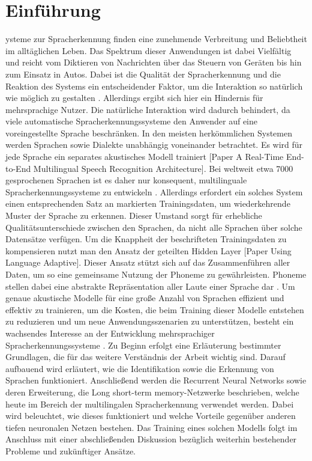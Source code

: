 \section{Einführung}\label{sec:introduction}
ysteme zur Spracherkennung finden eine zunehmende Verbreitung und Beliebtheit im alltäglichen Leben. Das Spektrum dieser Anwendungen ist dabei Vielfältig und reicht vom Diktieren von Nachrichten über das Steuern von Geräten bis hin zum Einsatz in Autos. Dabei ist die Qualität der Spracherkennung und die Reaktion des Systems ein entscheidender Faktor, um die Interaktion so natürlich wie möglich zu gestalten \cite{Yu.2014}. Allerdings ergibt sich hier ein Hindernis für mehrsprachige Nutzer. Die natürliche Interaktion wird dadurch behindert, da viele automatische Spracherkennungssysteme den Anwender auf eine voreingestellte Sprache beschränken. In den meisten herkömmlichen Systemen werden Sprachen sowie Dialekte unabhängig voneinander betrachtet. Es wird für jede Sprache ein separates akustisches Modell trainiert [Paper A Real-Time End-to-End Multilingual Speech Recognition Architecture]. Bei weltweit etwa 7000 gesprochenen Sprachen ist es daher nur konsequent, multilinguale Spracherkennungssysteme zu entwickeln \cite{Gary.2018}. Allerdings erfordert ein solches System einen entsprechenden Satz an markierten Trainingsdaten, um wiederkehrende Muster der Sprache zu erkennen. 
Dieser Umstand sorgt für erhebliche Qualitätsunterschiede zwischen den Sprachen, da nicht alle Sprachen über solche Datensätze verfügen. Um die Knappheit der beschrifteten Trainingsdaten zu kompensieren nutzt man den Ansatz der geteilten Hidden Layer [Paper Using Language Adaptive]. Dieser Ansatz stützt sich auf das Zusammenführen aller Daten, um so eine gemeinsame Nutzung der Phoneme zu gewährleisten.  Phoneme stellen dabei eine abstrakte Repräsentation aller Laute einer Sprache dar . Um genaue akustische Modelle für eine große Anzahl von Sprachen effizient und effektiv zu trainieren, um die Kosten, die beim Training dieser Modelle entstehen zu reduzieren und um neue Anwendungsszenarien zu unterstützen, besteht ein wachsendes Interesse an der Entwicklung mehrsprachiger Spracherkennungssysteme \cite{Yu.2014}. 
Zu Beginn erfolgt eine Erläuterung bestimmter Grundlagen, die für das weitere Verständnis der Arbeit wichtig sind. Darauf aufbauend wird erläutert, wie die Identifikation sowie die Erkennung von Sprachen funktioniert. Anschließend werden die Recurrent Neural Networks sowie deren Erweiterung, die Long short-term memory-Netzwerke beschrieben, welche heute im Bereich der multilingalen Spracherkennung verwendet werden. Dabei wird beleuchtet, wie dieses funktioniert und welche Vorteile gegenüber anderen tiefen neuronalen Netzen bestehen. Das Training eines solchen Modells folgt im Anschluss mit einer abschließenden Diskussion bezüglich weiterhin bestehender Probleme und zukünftiger Ansätze.

